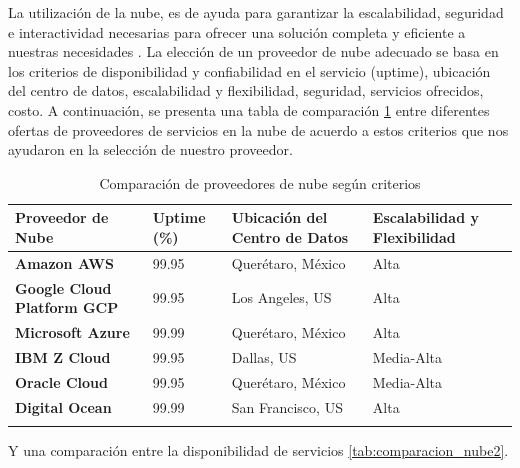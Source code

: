 La utilización de la nube, es de ayuda para garantizar la escalabilidad, seguridad e interactividad necesarias para ofrecer una solución completa y eficiente a nuestras necesidades \cite{IoTandCloudConvergence}. La elección de un proveedor de nube adecuado se basa en los criterios de disponibilidad y confiabilidad en el servicio (uptime), ubicación del centro de datos, escalabilidad y flexibilidad, seguridad, servicios ofrecidos, costo. A continuación, se presenta una tabla de comparación \ref{tab:comparacion_nube1} entre diferentes ofertas de proveedores de servicios en la nube de acuerdo a estos criterios que nos ayudaron en la selección de nuestro proveedor.
%
\begin{longtable}{|m{4.5cm}|m{2.5cm}|m{5cm}|m{3cm}|}
\hline
\textbf{Proveedor de Nube} & \textbf{Uptime (\%)} & \textbf{Ubicación del Centro de Datos} & \textbf{Escalabilidad y Flexibilidad} \\
\hline
\textbf{Amazon AWS \cite{aws}} & 99.95 & Querétaro, México & Alta \\
\hline
\textbf{Google Cloud Platform GCP \cite{gcp}} & 99.95 & Los Angeles, US & Alta \\
\hline
\textbf{Microsoft Azure \cite{azure}} & 99.99 & Querétaro, México & Alta \\
\hline
\textbf{IBM Z Cloud \cite{ibmcloud}} & 99.95 & Dallas, US & Media-Alta \\
\hline
\textbf{Oracle Cloud \cite{oraclecloud}} & 99.95 & Querétaro, México & Media-Alta \\
\hline
\textbf{Digital Ocean \cite{digitalocean}} & 99.99 & San Francisco, US & Alta \\
\hline
\caption{Comparación de proveedores de nube según criterios}
\label{tab:comparacion_nube1}
\end{longtable}
%
Y una comparación entre la disponibilidad de servicios \ref{tab:comparacion_nube2}.
%
